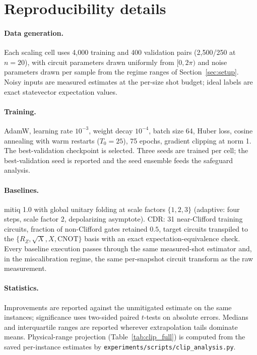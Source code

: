 \documentclass[11pt]{article}
\begin{document}
\section{Reproducibility details}
\label{app:repro}

\paragraph{Data generation.} Each scaling cell uses 4{,}000 training and 400 validation pairs (2{,}500/250 at $n{=}20$), with circuit parameters drawn uniformly from $[0,2\pi)$ and noise parameters drawn per sample from the regime ranges of Section~\ref{sec:setup}. Noisy inputs are measured estimates at the per-size shot budget; ideal labels are exact statevector expectation values.

\paragraph{Training.} AdamW, learning rate $10^{-3}$, weight decay $10^{-4}$, batch size 64, Huber loss, cosine annealing with warm restarts ($T_0{=}25$), 75 epochs, gradient clipping at norm 1. The best-validation checkpoint is selected. Three seeds are trained per cell; the best-validation seed is reported and the seed ensemble feeds the safeguard analysis.

\paragraph{Baselines.} mitiq 1.0 with global unitary folding at scale factors $\{1,2,3\}$ (adaptive: four steps, scale factor 2, depolarizing asymptote). CDR: 31 near-Clifford training circuits, fraction of non-Clifford gates retained $0.5$, target circuits transpiled to the $\{R_Z,\sqrt{X},X,\mathrm{CNOT}\}$ basis with an exact expectation-equivalence check. Every baseline execution passes through the same measured-shot estimator and, in the miscalibration regime, the same per-snapshot circuit transform as the raw measurement.

\paragraph{Statistics.} Improvements are reported against the unmitigated estimate on the same instances; significance uses two-sided paired $t$-tests on absolute errors. Medians and interquartile ranges are reported wherever extrapolation tails dominate means. Physical-range projection (Table~\ref{tab:clip_full}) is computed from the saved per-instance estimates by \texttt{experiments/scripts/clip\_analysis.py}.
\end{document}

